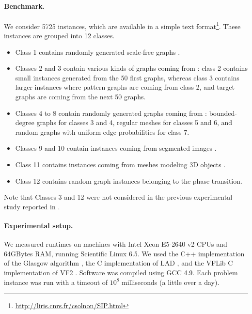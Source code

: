 \documentclass{llncs}
\begin{document}
\paragraph{Benchmark.}

We consider 5725 instances, which are available in a simple text
format\footnote{\url{http://liris.cnrs.fr/csolnon/SIP.html}}. These
instances are grouped into 12 classes.

\begin{itemize}
\item Class 1 contains randomly generated scale-free graphs \cite{constraints10}.
\item Classes 2 and 3 contain various kinds of graphs coming from \cite{LV02}: class 2 contains small
    instances generated from the 50 first graphs, whereas class 3 contains larger
    instances where pattern graphs are coming from class 2, and target graphs are coming from the
    next 50 graphs.
\item Classes 4 to 8 contain randomly generated graphs coming from \cite{GraphDatabase}:
    bounded-degree graphs for classes 3 and 4, regular meshes for classes 5 and 6, and random graphs
    with uniform edge probabilities for class 7.
\item Classes 9 and 10 contain instances coming from segmented images \cite{pr15,cviu11}.
\item Class 11 contains instances coming from meshes modeling 3D objects \cite{cviu11}.
\item Class 12 contains random graph instances belonging to the phase transition.
\end{itemize}

Note that Classes 3 and 12 were not considered in the previous experimental study reported in \cite{McCreesh:2015}.


\paragraph{Experimental setup.} We measured runtimes on machines with Intel Xeon E5-2640 v2 CPUs and 64GBytes RAM, running
Scientific Linux 6.5. We used the C++ implementation of the Glasgow algorithm \cite{McCreesh:2015},
the C implementation of LAD \cite{Solnon:2010}, and the VFLib C implementation of VF2
\cite{Cordella:2004}. Software was compiled using GCC 4.9. Each problem instance was run with a
timeout of $10^8$ milliseconds (a little over a day).
\end{document}
